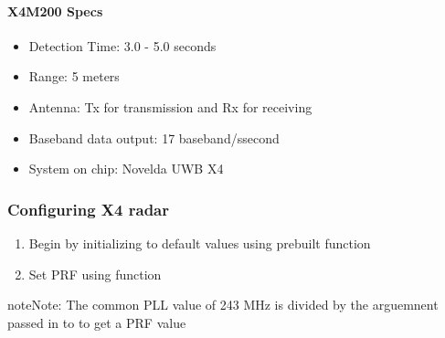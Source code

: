 \documentclass[letterpaper,10pt,english]{sphinxmanual}
\begin{document}
\paragraph{X4M200 Specs}
\label{\detokenize{Radar information:x4m200-specs}}\begin{itemize}
\item {} 
Detection Time: 3.0  - 5.0 seconds

\item {} 
Range: 5 meters

\item {} 
Antenna: Tx for transmission and Rx for receiving

\item {} 
Baseband data output: 17 baseband/ssecond

\item {} 
System on chip: Novelda UWB X4

\end{itemize}


\subsubsection{Configuring X4 radar}
\label{\detokenize{Radar information:configuring-x4-radar}}\begin{enumerate}
\def\theenumi{\arabic{enumi}}
\def\labelenumi{\theenumi .}
\makeatletter\def\p@enumii{\p@enumi \theenumi .}\makeatother
\item {} 
Begin by initializing to default values using prebuilt function 

\item {} 
Set PRF using function 

\end{enumerate}

\begin{sphinxadmonition}{note}{Note:}
The common PLL value of 243 MHz is divided by the arguemnent passed in to  to get a PRF value
\end{sphinxadmonition}
\end{document}
